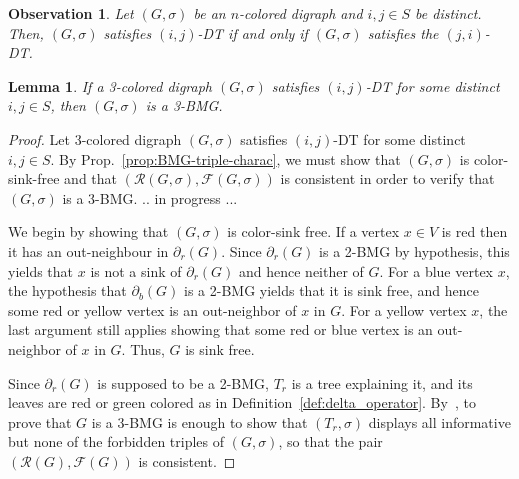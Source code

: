 \documentclass[final,3p,times]{elsarticle}
\newtheorem{lemma}[theorem]{Lemma}%
\newtheorem{fact}{Observation}[section]
\newcommand{\TODO}[1]{\begingroup\color{red}#1\endgroup}
\newcommand{\mh}[1]{\begingroup\color{blue}#1\endgroup}
\begin{document}
\begin{fact}
\mh{Let $(G,\sigma)$ be an $n$-colored digraph and $i,j\in S$ be distinct. 
Then, $(G,\sigma)$ satisfies $(i,j)$-DT  if and only if 
$(G,\sigma)$ satisfies the $(j,i)$-DT.}
\end{fact}




\begin{lemma}\label{lem:sufficient_condition}
\mh{If a 3-colored digraph $(G,\sigma)$ satisfies $(i,j)$-DT for some 
distinct $i,j\in S$, then $(G,\sigma)$ is a 3-BMG.}
\end{lemma}
\begin{proof}
\mh{
Let  3-colored digraph $(G,\sigma)$ satisfies $(i,j)$-DT for some 
distinct $i,j\in S$. By Prop.\ \ref{prop:BMG-triple-charac}, we must show that
$(G,\sigma)$ is
  color-sink-free and that $(\mathscr{R}(G,\sigma),\mathscr{F}(G,\sigma))$
  is consistent in order to verify that $(G,\sigma)$ is a 3-BMG.
}
\TODO{.. in progress ... }

We begin by showing that $(G,\sigma)$ is color-sink free. If a vertex $x\in V$ is red then it has an out-neighbour in $\partial_{r}(G)$. Since $\partial_{r}(G)$ is a 2-BMG by hypothesis, this yields that $x$ is not a sink of $\partial_{r}(G)$ and hence neither of $G$. For a blue vertex $x$, the hypothesis that $\partial_b(G)$ is a 2-BMG yields that it is sink free, and hence some red or yellow vertex is an out-neighbor of $x$ in $G$. For a yellow vertex $x$, the last argument still applies showing that some red or blue vertex is an out-neighbor of $x$ in $G$. Thus, $G$ is sink free.

Since $\partial_{r}(G)$ is supposed to be a 2-BMG, $T_r$ is a tree explaining it, and its leaves are red or green colored as in Definition~\ref{def:delta_operator}. By~\cite[Proposition~2.3]{korchmaros2021quasi}, to prove that $G$ is a 3-BMG is enough to show that $(T_r,\sigma)$ displays all informative but none of the forbidden triples of $(G,\sigma)$, so that the pair $(\mathscr{R}(G),\mathscr{F}(G))$ is consistent.


\end{proof}
\end{document}
